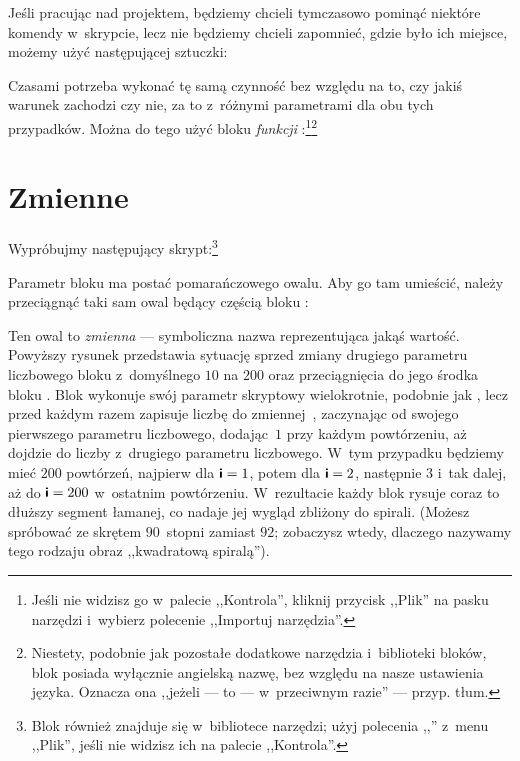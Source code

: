 \documentclass[a4paper]{report}
\begin{document}

Jeśli pracując nad projektem, będziemy chcieli tymczasowo pominąć niektóre komendy w~skrypcie, lecz nie będziemy chcieli zapomnieć, gdzie było ich miejsce, możemy użyć następującej sztuczki:\nopagebreak


Czasami potrzeba wykonać tę samą czynność bez względu na to, czy jakiś warunek zachodzi czy nie, za to z~różnymi parametrami dla obu tych przypadków. Można do tego użyć bloku \emph{funkcji} :\footnote{\onehalfspacing Jeśli nie widzisz go w~palecie ,,Kontrola'', kliknij przycisk ,,Plik''  na pasku narzędzi i~wybierz polecenie ,,Importuj narzędzia''.}\footnote{Niestety, podobnie jak pozostałe dodatkowe narzędzia i~biblioteki bloków, blok  posiada wyłącznie angielską nazwę, bez względu na nasze ustawienia języka. Oznacza ona ,,jeżeli --- to --- w~przeciwnym razie'' --- przyp. tłum.}\nopagebreak


\section{Zmienne}

Wypróbujmy następujący skrypt:\footnote{Blok \footnotemark{} również znajduje się w~bibliotece narzędzi; użyj polecenia ,,'' z~menu ,,Plik'', jeśli nie widzisz ich na palecie ,,Kontrola''.}\nopagebreak


Parametr bloku  ma postać pomarańczowego owalu. Aby go tam umieścić, należy przeciągnąć taki sam owal będący częścią bloku :\nopagebreak


Ten owal to \emph{zmienna} --- symboliczna nazwa reprezentująca jakąś wartość. Powyższy rysunek przedstawia sytuację sprzed zmiany drugiego parametru liczbowego bloku  z~domyślnego $10$ na $200$ oraz przeciągnięcia do jego środka bloku . Blok  wykonuje swój parametr skryptowy wielokrotnie, podobnie jak , lecz przed każdym razem zapisuje liczbę do zmiennej~, zaczynając od swojego pierwszego parametru liczbowego, dodając~$1$ przy każdym powtórzeniu, aż dojdzie do liczby z~drugiego parametru liczbowego. W~tym przypadku będziemy mieć $200$ powtórzeń, najpierw dla $\textsf{\textbf{i}}=1$, potem dla $\textsf{\textbf{i}}=2$, następnie $3$ i~tak dalej, aż do $\textsf{\textbf{i}}=200$ w~ostatnim powtórzeniu. W~rezultacie każdy blok  rysuje coraz to dłuższy segment łamanej, co nadaje jej wygląd zbliżony do spirali. (Możesz spróbować ze skrętem $90$~stopni zamiast $92$; zobaczysz wtedy, dlaczego nazywamy tego rodzaju obraz ,,kwadratową spiralą'').
\end{document}
